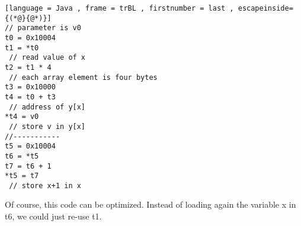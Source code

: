 \begin{lstlisting}[language = Java , frame = trBL , firstnumber = last , escapeinside={(*@}{@*)}]
// parameter is v0
t0 = 0x10004
t1 = *t0
 // read value of x
t2 = t1 * 4
 // each array element is four bytes
t3 = 0x10000
t4 = t0 + t3
 // address of y[x]
*t4 = v0
 // store v in y[x]
//-----------
t5 = 0x10004
t6 = *t5
t7 = t6 + 1
*t5 = t7
 // store x+1 in x
\end{lstlisting}

Of course, this code can be optimized. Instead of loading again the variable x in t6, we could just re-use t1.